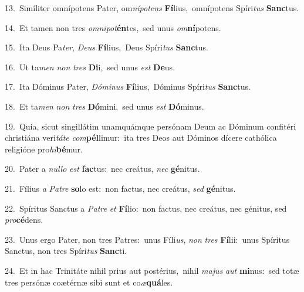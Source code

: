 {\numbfont\textcolor{\numbcolor}{13.}}~Simíliter omnípotens Pater, om\-\textit{ní}\-\textit{pot}\textit{ens} \textbf{Fí}\-lius,~\star omnípotens Spíri\textit{tus} \textbf{Sanc}\-tus.\par
{\numbfont\textcolor{\numbcolor}{14.}}~Et tamen non tres \textit{om}\-\textit{ni}\textit{pot}\textbf{én}tes,~\star sed unus \textit{om}\-\textbf{ní}potens.\par
{\numbfont\textcolor{\numbcolor}{15.}}~Ita Deus Pa\-\textit{ter}\-, \textit{De}\-\textit{us} \textbf{Fí}\-lius,~\star Deus Spíri\textit{tus} \textbf{Sanc}\-tus.\par
{\numbfont\textcolor{\numbcolor}{16.}}~Ut ta\textit{men} \textit{non} \textit{tres} \textbf{Di}\-i,~\star sed unus \textit{est} \textbf{De}\-us.\par
{\numbfont\textcolor{\numbcolor}{17.}}~Ita Dóminus Pater, \textit{Dó}\-\textit{mi}\textit{nus} \textbf{Fí}\-lius,~\star Dóminus Spíri\textit{tus} \textbf{Sanc}\-tus.\par
{\numbfont\textcolor{\numbcolor}{18.}}~Et ta\textit{men} \textit{non} \textit{tres} \textbf{Dó}\-mini,~\star sed unus \textit{est} \textbf{Dó}\-minus.\par
{\numbfont\textcolor{\numbcolor}{19.}}~Quia, sicut singillátim unamquámque persónam Deum ac Dóminum confitéri christiána veri\-\textit{tá}\-\textit{te} \textit{com}\-\textbf{pél}limur:~\star ita tres Deos aut Dóminos dícere cathólica religióne pro\-\textit{hi}\-\textbf{bé}mur.\par
{\numbfont\textcolor{\numbcolor}{20.}}~Pater a \textit{nul}\-\textit{lo} \textit{est} \textbf{fac}\-tus:~\star nec creátus, \textit{nec} \textbf{gé}\-nitus.\par
{\numbfont\textcolor{\numbcolor}{21.}}~Fílius \textit{a} \textit{Pa}\-\textit{tre} \textbf{so}\-lo est:~\star non factus, nec creátus, \textit{sed} \textbf{gé}\-nitus.\par
{\numbfont\textcolor{\numbcolor}{22.}}~Spíritus Sanctus a \textit{Pa}\-\textit{tre} \textit{et} \textbf{Fí}\-lio:~\star non factus, nec creátus, nec génitus, sed \textit{pro}\-\textbf{cé}dens.\par
{\numbfont\textcolor{\numbcolor}{23.}}~Unus ergo Pater, non tres Patres:~\dagger unus Fíli\-\textit{us}\-, \textit{non} \textit{tres} \textbf{Fí}\-lii:~\star unus Spíritus Sanctus, non tres Spíri\textit{tus} \textbf{Sanc}\-ti.\par
{\numbfont\textcolor{\numbcolor}{24.}}~Et in hac Trinitáte nihil prius aut postérius,~\dagger nihil \textit{ma}\-\textit{jus} \textit{aut} \textbf{mi}\-nus:~\star sed totæ tres persónæ coætérnæ sibi sunt et co\-\textit{æ}\-\textbf{quá}les.\par

